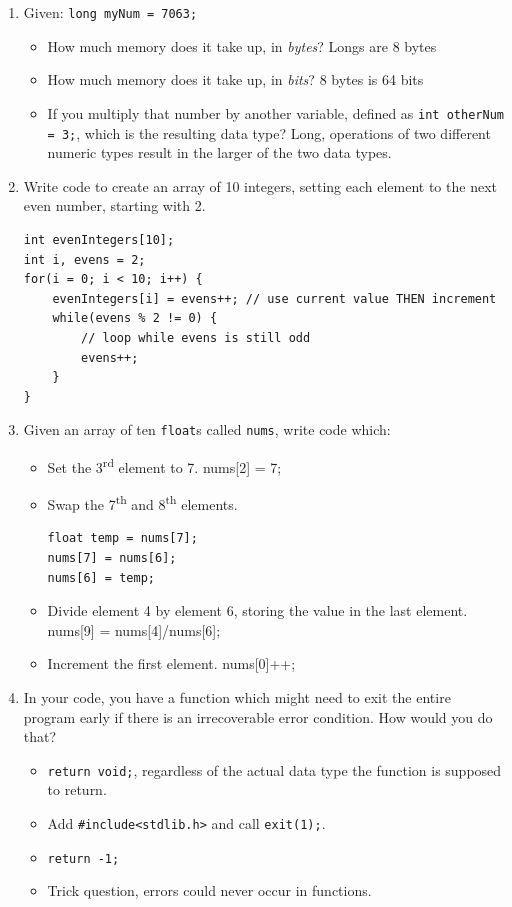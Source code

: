 \documentclass[letter,11pt]{article}
\newcommand*\tick{\item[\Checkmark]}
\newcommand*\fail{\item[\XSolidBrush]}
\begin{document}
\begin{enumerate}
    \item Given: \texttt{long myNum = 7063;}
    \begin{itemize}
        \item How much memory does it take up, in \textit{bytes}? {\color{red}Longs are 8 bytes}
        \item How much memory does it take up, in \textit{bits}? {\color{red}8 bytes is 64 bits}
        \item If you multiply that number by another variable, defined as \texttt{int otherNum = 3;}, which is the resulting data type? {\color{red}Long, operations of two different numeric types result in the larger of the two data types.}
    \end{itemize}
    
    \item Write code to create an array of 10 integers, setting each element to the next even number, starting with 2.
    {
    \color{red}%
    \begin{verbatim}
int evenIntegers[10];
int i, evens = 2;
for(i = 0; i < 10; i++) {
    evenIntegers[i] = evens++; // use current value THEN increment
    while(evens % 2 != 0) {
        // loop while evens is still odd
        evens++;
    }
}
    \end{verbatim}
    }
    
    \item Given an array of ten \texttt{float}s called \texttt{nums}, write code which:
    \begin{itemize}
        \item Set the 3\textsuperscript{rd} element to 7. {\color{red}nums[2] = 7;}
        \item Swap the 7\textsuperscript{th} and 8\textsuperscript{th} elements.
        {
    \color{red}%
    \begin{verbatim}
float temp = nums[7];
nums[7] = nums[6];
nums[6] = temp;
    \end{verbatim}
    }
        \item Divide element 4 by element 6, storing the value in the last element. \\
        {\color{red} nums[9] = nums[4]/nums[6];}
        \item Increment the first element. {\color{red}nums[0]++;}
    \end{itemize}
    
    \item In your code, you have a function which might need to exit the entire program early if there is an irrecoverable error condition. How would you do that?
    \begin{itemize}
        \fail \texttt{return void;}, regardless of the actual data type the function is supposed to return.
        \tick Add \texttt{\#include<stdlib.h>} and call \texttt{exit(1);}.
        \fail \texttt{return -1;}
        \fail Trick question, errors could never occur in functions.
    \end{itemize}
    

\end{enumerate}
\end{document}
